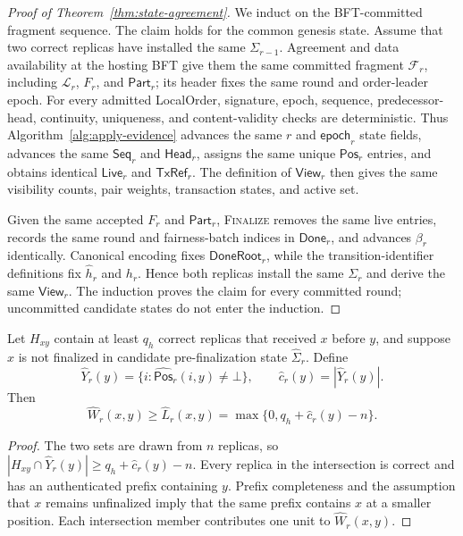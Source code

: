 \begin{proof}[Proof of Theorem~\ref{thm:state-agreement}]
We induct on the BFT-committed fragment sequence.  The claim holds for the
common genesis state.  Assume that two correct replicas have installed the
same $\Sigma_{r-1}$.  Agreement and data availability at the hosting BFT give
them the same committed fragment $\mathcal F_r$, including
$\mathcal L_r$, $F_r$, and $\mathsf{Part}_r$; its header fixes the same round
and order-leader epoch.  For every admitted LocalOrder,
signature, epoch, sequence, predecessor-head, continuity, uniqueness, and
content-validity checks are deterministic.  Thus
Algorithm~\ref{alg:apply-evidence} advances the same
$r$ and $\mathsf{epoch}_r$ state fields, advances the same
$\mathsf{Seq}_r$ and $\mathsf{Head}_r$, assigns the same unique
$\mathsf{Pos}_r$ entries, and obtains identical $\mathsf{Live}_r$ and
$\mathsf{TxRef}_r$.  The definition of $\mathsf{View}_r$ then gives the same
visibility counts, pair weights, transaction states, and active set.

Given the same accepted $F_r$ and $\mathsf{Part}_r$, \textsc{Finalize}
removes the same live entries, records the same round and fairness-batch
indices in $\mathsf{Done}_r$, and advances $\beta_r$ identically.  Canonical
encoding fixes $\mathsf{DoneRoot}_r$, while
the transition-identifier definitions fix $\widehat h_r$ and $h_r$.  Hence both
replicas install the same $\Sigma_r$ and derive the same
$\mathsf{View}_r$.  The induction proves the claim for every committed round;
uncommitted candidate states do not enter the induction.
\end{proof}

\begin{lemma}
\label{lem:committed-observation-coverage}
Let $H_{xy}$ contain at least $q_h$ correct replicas that received $x$ before
$y$, and suppose $x$ is not finalized in candidate pre-finalization state
$\widehat\Sigma_r$.  Define
\[
 \widehat Y_r(y)=\{i:\widehat{\mathsf{Pos}}_r(i,y)\ne\bot\},
 \qquad \widehat c_r(y)=|\widehat Y_r(y)|.
\]
Then
\begin{equation}
 \widehat W_r(x,y)\ge \widehat L_r(x,y)
   =\max\{0,q_h+\widehat c_r(y)-n\}.
 \label{eq:coverage-lower-bound}
\end{equation}
\end{lemma}

\begin{proof}
The two sets are drawn from $n$ replicas, so
$|H_{xy}\cap\widehat Y_r(y)|\ge q_h+\widehat c_r(y)-n$.  Every replica in the
intersection is correct and has an authenticated prefix containing $y$.
Prefix completeness and
the assumption that $x$ remains unfinalized imply that the same prefix contains
$x$ at a smaller position.  Each intersection member contributes one unit to
$\widehat W_r(x,y)$.
\end{proof}

